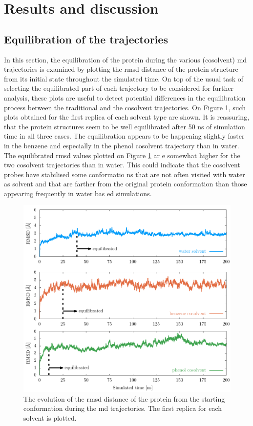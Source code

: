 \section{Results and discussion}

\subsection{Equilibration of the trajectories}
In this section, the equilibration of the protein during the various (cosolvent) \gls{md} trajectories is examined by plotting the \gls{rmsd} distance of the protein structure from its initial state throughout the simulated time.
On top of the usual task of selecting the equilibrated part of each trajectory to be considered for further analysis, these plots are useful to detect potential differences in the equilibration process between the traditional and the cosolvent trajectories.
On Figure \ref{fig:rmsd_equilib}, such plots obtained for the first replica of each solvent type are shown.
It is reassuring, that the protein structures seem to be well equilibrated after 50 ns of simulation time in all three cases.
The equilibration appears to be happening slightly faster in the benzene and especially in the phenol cosolvent trajectory than in water.
The equilibrated \gls{rmsd} values plotted on Figure \ref{fig:rmsd_equilib} ar
e somewhat higher for the two cosolvent trajectories than in water.
This could indicate that the cosolvent probes have stabilised some conformatio
ns that are not often visited with water as solvent and that are farther from
the original protein conformation than those appearing frequently in water bas
ed simulations.
\begin{figure}
\centering
\includegraphics[width=\textwidth]{sections/results/images/rmsd_equilib/to_pdf/rmsd_equilib_to_pdf.pdf}
\caption{The evolution of the \gls{rmsd} distance of the protein from the starting conformation during the \gls{md} trajectories. The first replica for each solvent is plotted.}
\label{fig:rmsd_equilib}
\end{figure}

